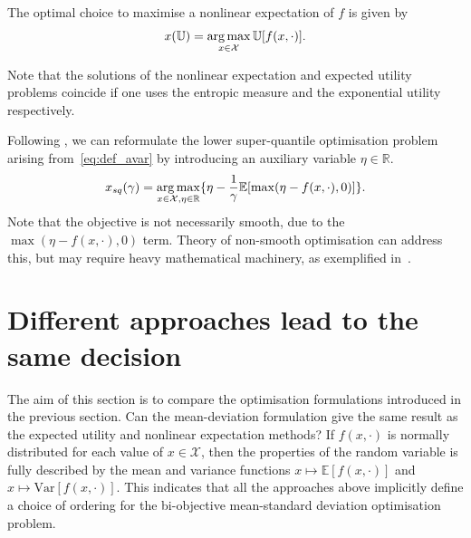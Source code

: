 \documentclass[main.tex]{subfiles}
\begin{document}
\begin{problem}
  The optimal choice to maximise a nonlinear expectation
  of $f$ is given by
  \begin{align}
    x(\mathbb{U})=\operatorname*{arg\,max}_{x\in\mathcal{X}} \mathbb{U}[f(x,\cdot)].
  \end{align}
\end{problem}

Note that the solutions of the nonlinear expectation and expected
utility problems coincide if one uses the entropic measure and the exponential
utility respectively.
\begin{example}
  Following \citep{ben2007old}, we can reformulate the lower
  super-quantile optimisation problem arising from~\eqref{eq:def_avar}
  by introducing an auxiliary variable $\eta\in\mathbb{R}$.
  \begin{equation}\label{eq:opt_avar}
    x_{sq}({\gamma})
    =\operatorname*{arg\,max}_{x\in\mathcal{X},\eta\in\mathbb{R}}
    \{\eta - \frac{1}{\gamma}\mathbb{E}[\max(\eta-f(x,\cdot),0)]\}.
  \end{equation}
  Note that the objective is not necessarily smooth, due to the
  $\max(\eta-f(x,\cdot),0)$ term. Theory of non-smooth optimisation
  can address this, but may require heavy mathematical machinery, as
  exemplified in~\cite{kouri2016risk}.
\end{example}


\section{Different approaches lead to the same decision}\label{sec:one_comparison_orderings}
The aim of this section is to compare the
optimisation formulations introduced in the previous section.
Can the mean-deviation formulation give the
same result as the expected utility and nonlinear expectation methods?
If $f(x,\cdot)$ is normally distributed for each value of
$x\in\mathcal{X}$, then the properties of the random variable is fully
described by the mean and variance functions $x\mapsto
\mathbb{E}[f(x,\cdot)]$ and $x\mapsto \mbox{Var}[f(x,\cdot)]$. This
indicates that all the approaches above implicitly define a
choice of ordering for the bi-objective mean-standard deviation
optimisation problem.
\end{document}
